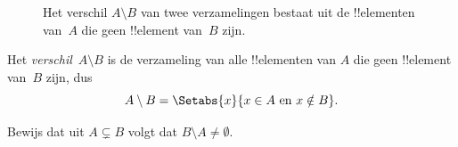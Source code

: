 \documentclass[../../../include/open-logic-section]{subfiles}
\begin{document}
\begin{figure}
  \caption{Het verschil $A \setminus B$ van twee verzamelingen bestaat uit
    de !!{element}en van~$A$ die geen !!{element} van~$B$ zijn.}
\end{figure}

\begin{defn}[Verschil]
Het \emph{verschil}~$A \setminus B$ is de verzameling van alle !!{element}en
van $A$ die geen !!{element} van~$B$ zijn, dus
\[
A\setminus B = \Setabs{x}{x\in A \text{ en } x \notin B}.
\]
\end{defn}

\begin{prob}
	Bewijs dat uit $A \subsetneq B$ volgt dat $B \setminus A \neq \emptyset$.
\end{prob}
\end{document}
